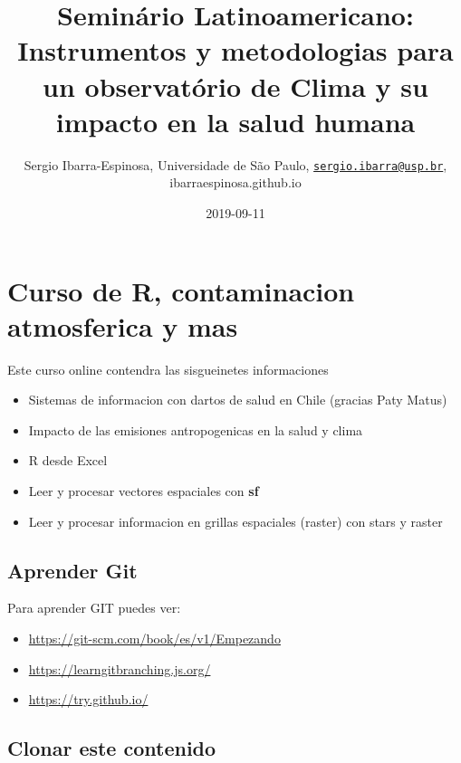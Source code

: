 \documentclass[]{book}
\title{Seminário Latinoamericano: Instrumentos y metodologias para un observatório de Clima y su impacto en la salud humana}
\author{Sergio Ibarra-Espinosa, Universidade de São Paulo, \href{mailto:sergio.ibarra@usp.br}{\nolinkurl{sergio.ibarra@usp.br}}, ibarraespinosa.github.io}
\date{2019-09-11}
\providecommand{\tightlist}{%
  \setlength{\itemsep}{0pt}\setlength{\parskip}{0pt}}
\begin{document}
\maketitle

{
\setcounter{tocdepth}{1}
\tableofcontents
}
\hypertarget{curso-de-r-contaminacion-atmosferica-y-mas}{%
\chapter*{Curso de R, contaminacion atmosferica y mas}\label{curso-de-r-contaminacion-atmosferica-y-mas}}

Este curso online contendra las sisgueinetes informaciones

\begin{itemize}
\tightlist
\item
  Sistemas de informacion con dartos de salud en Chile (gracias Paty Matus)
\item
  Impacto de las emisiones antropogenicas en la salud y clima
\item
  R desde Excel
\item
  Leer y procesar vectores espaciales con \textbf{sf} \citep{sf}
\item
  Leer y procesar informacion en grillas espaciales (raster) con stars\citep{stars} y raster\citep{raster}
\end{itemize}

\hypertarget{aprender-git}{%
\section*{Aprender Git}\label{aprender-git}}

Para aprender GIT puedes ver:

\begin{itemize}
\tightlist
\item
  \url{https://git-scm.com/book/es/v1/Empezando}
\item
  \url{https://learngitbranching.js.org/}
\item
  \url{https://try.github.io/}
\end{itemize}

\hypertarget{clonar-este-contenido}{%
\section*{Clonar este contenido}\label{clonar-este-contenido}}
\end{document}
